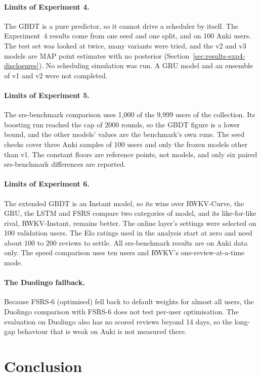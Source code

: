 \paragraph{Limits of Experiment 4.}
The GBDT is a pure predictor, so it cannot drive a scheduler by itself. The Experiment~4 results come from one seed and one split, and on 100 Anki users.
The test set was looked at twice, many variants were tried, and the v2 and v3 models are MAP point estimates with no posterior
(Section~\ref{sec:results-exp4-disclosures}). No scheduling simulation was run. A GRU model and an ensemble of v1 and v2 were not completed.

\paragraph{Limits of Experiment 5.}
The srs-benchmark comparison uses 1,000 of the 9,999 users of the collection. Its boosting run reached the cap of 2000 rounds, so the GBDT figure is a lower bound, and the other models' values are the benchmark's own runs. The seed checks cover three Anki samples of 100 users and only the frozen models other than v1. The constant floors are reference points, not models, and only six paired srs-benchmark differences are reported.

\paragraph{Limits of Experiment 6.}
The extended GBDT is an Instant model, so its wins over RWKV-Curve, the GRU, the LSTM and FSRS compare two categories of
model, and its like-for-like rival, RWKV-Instant, remains better. The online layer's settings were selected on 100 validation users. The Elo ratings used in the analysis start at zero and need about 100 to 200 reviews to settle. All
srs-benchmark results are on Anki data only. The speed comparison uses ten users and RWKV's one-review-at-a-time mode.

\paragraph{The Duolingo fallback.}
Because FSRS-6 (optimised) fell back to default weights for almost all users, the Duolingo comparison with FSRS-6
does not test per-user optimisation. The evaluation on Duolingo also has no scored reviews beyond 14 days, so the
long-gap behaviour that is weak on Anki is not measured there.

\section{Conclusion}
\label{sec:concl-conclusion}

